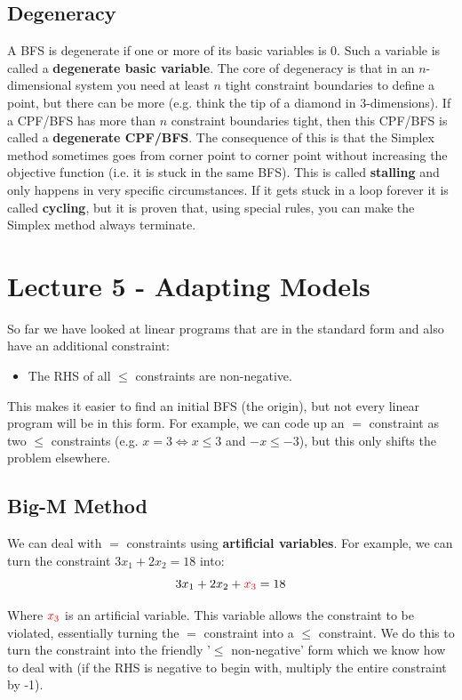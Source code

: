 \documentclass[12pt]{article}
\begin{document}
\subsection*{Degeneracy}
A BFS is degenerate if one or more of its basic variables is 0.
Such a variable is called a \textbf{degenerate basic variable}.
The core of degeneracy is that in an $n$-dimensional system you need at least $n$ tight constraint boundaries to define a point, but there can be more (e.g. think the tip of a diamond in 3-dimensions).
If a CPF/BFS has more than $n$ constraint boundaries tight, then this CPF/BFS is called a \textbf{degenerate CPF/BFS}.
The consequence of this is that the Simplex method sometimes goes from corner point to corner point without increasing the objective function (i.e. it is stuck in the same BFS).
This is called \textbf{stalling} and only happens in very specific circumstances.
If it gets stuck in a loop forever it is called \textbf{cycling}, but it is proven that, using special rules, you can make the Simplex method always terminate.

%
%
\newpage
\section*{Lecture 5 - Adapting Models}
So far we have looked at linear programs that are in the standard form and also have an additional constraint:

\begin{itemize}
    \item The RHS of all $\leq$ constraints are non-negative.
\end{itemize}

\noindent
This makes it easier to find an initial BFS (the origin), but not every linear program will be in this form.
For example, we can code up an $=$ constraint as two $\leq$ constraints (e.g. $x = 3 \Leftrightarrow x \leq 3$ and $-x \leq -3$), but this only shifts the problem elsewhere.

\subsection*{Big-M Method}
We can deal with $=$ constraints using \textbf{artificial variables}.
For example, we can turn the constraint $3x_1 + 2x_2 = 18$ into:
\[ 3x_1 + 2x_2 + \textcolor{red}{x_3} = 18 \]

\noindent
Where $\textcolor{red}{x_3}$ is an artificial variable.
This variable allows the constraint to be violated, essentially turning the $=$ constraint into a $\leq$ constraint.
We do this to turn the constraint into the friendly '$\leq$ non-negative' form which we know how to deal with (if the RHS is negative to begin with, multiply the entire constraint by -1).
\end{document}
